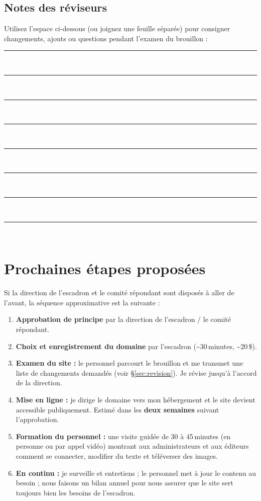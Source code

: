 \documentclass[11pt,letterpaper]{article}
\begin{document}
\subsection*{Notes des réviseurs}
\noindent Utilisez l'espace ci-dessous (ou joignez une feuille séparée) pour consigner changements, ajouts ou questions pendant l'examen du brouillon :

\vspace{0.4em}
\rule{\linewidth}{0.4pt}\\[1.4em]
\rule{\linewidth}{0.4pt}\\[1.4em]
\rule{\linewidth}{0.4pt}\\[1.4em]
\rule{\linewidth}{0.4pt}\\[1.4em]
\rule{\linewidth}{0.4pt}\\[1.4em]
\rule{\linewidth}{0.4pt}\\[1.4em]
\rule{\linewidth}{0.4pt}\\[1.4em]
\rule{\linewidth}{0.4pt}\\[1.4em]

\section{Prochaines étapes proposées}

Si la direction de l'escadron et le comité répondant sont disposés à aller de l'avant, la séquence approximative est la suivante :

\begin{enumerate}[leftmargin=1.6em,itemsep=0.25em]
  \item \textbf{Approbation de principe} par la direction de l'escadron / le comité répondant.
  \item \textbf{Choix et enregistrement du domaine} par l'escadron (\textasciitilde{}30\,minutes, \textasciitilde{}20\,\$).
  \item \textbf{Examen du site :} le personnel parcourt le brouillon et me transmet une liste de changements demandés (voir \S\ref{sec:revision}). Je révise jusqu'à l'accord de la direction.
  \item \textbf{Mise en ligne :} je dirige le domaine vers mon hébergement et le site devient accessible publiquement. Estimé dans les \textbf{deux semaines} suivant l'approbation.
  \item \textbf{Formation du personnel :} une visite guidée de 30 à 45\,minutes (en personne ou par appel vidéo) montrant aux administrateurs et aux éditeurs comment se connecter, modifier du texte et téléverser des images.
  \item \textbf{En continu :} je surveille et entretiens ; le personnel met à jour le contenu au besoin ; nous faisons un bilan annuel pour nous assurer que le site sert toujours bien les besoins de l'escadron.
\end{enumerate}
\end{document}
